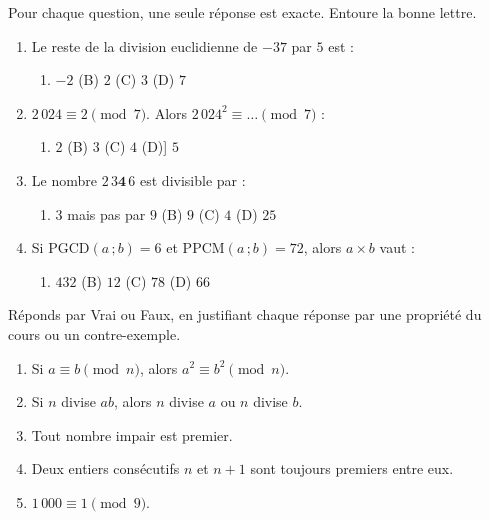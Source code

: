 \documentclass[11pt]{article}
\begin{document}
\begin{exercice}
Pour chaque question, une seule réponse est exacte. Entoure la bonne lettre.
\begin{enumerate}
\item Le reste de la division euclidienne de $-37$ par $5$ est :
\begin{enumerate}
\item[(A)] $-2$ \qquad (B) $2$ \qquad (C) $3$ \qquad (D) $7$
\end{enumerate}
\item $2\,024 \equiv 2 \pmod{7}$. Alors $2\,024^2 \equiv \dots \pmod{7}$ :
\begin{enumerate}
\item[(A)] $2$ \qquad (B) $3$ \qquad (C) $4$ \qquad (D)] $5$
\end{enumerate}
\item Le nombre $2\,3\mathbf{4}\,6$ est divisible par :
\begin{enumerate}
\item[(A)] $3$ mais pas par $9$ \qquad (B) $9$ \qquad (C) $4$ \qquad (D) $25$
\end{enumerate}
\item Si $\mathrm{PGCD}(a\,;b) = 6$ et $\mathrm{PPCM}(a\,;b) = 72$, alors $a \times b$ vaut :
\begin{enumerate}
\item[(A)] $432$ \qquad (B) $12$ \qquad (C) $78$ \qquad (D) $66$
\end{enumerate}
\end{enumerate}
\end{exercice}

\begin{exercice}
Réponds par Vrai ou Faux, en justifiant chaque réponse par une propriété du cours ou un contre-exemple.
\begin{enumerate}
\item Si $a \equiv b \pmod{n}$, alors $a^2 \equiv b^2 \pmod{n}$.
\item Si $n$ divise $ab$, alors $n$ divise $a$ ou $n$ divise $b$.
\item Tout nombre impair est premier.
\item Deux entiers consécutifs $n$ et $n+1$ sont toujours premiers entre eux.
\item $1\,000 \equiv 1 \pmod{9}$.
\end{enumerate}
\end{exercice}
\end{document}
